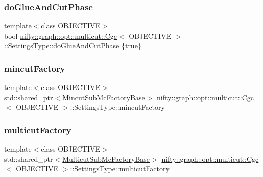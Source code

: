 \subsubsection{\texorpdfstring{do\+Glue\+And\+Cut\+Phase}{doGlueAndCutPhase}}
{\footnotesize\ttfamily template$<$class O\+B\+J\+E\+C\+T\+I\+VE$>$ \\
bool \hyperlink{classnifty_1_1graph_1_1opt_1_1multicut_1_1Cgc}{nifty\+::graph\+::opt\+::multicut\+::\+Cgc}$<$ O\+B\+J\+E\+C\+T\+I\+VE $>$\+::Settings\+Type\+::do\+Glue\+And\+Cut\+Phase \{true\}}

\mbox{\label{structnifty_1_1graph_1_1opt_1_1multicut_1_1Cgc_1_1SettingsType_a57a8c66be7f738117c692d3b694fcaeb}} 
\subsubsection{\texorpdfstring{mincut\+Factory}{mincutFactory}}
{\footnotesize\ttfamily template$<$class O\+B\+J\+E\+C\+T\+I\+VE$>$ \\
std\+::shared\+\_\+ptr$<$\hyperlink{classnifty_1_1graph_1_1opt_1_1multicut_1_1Cgc_ae8877e2556e794a6c14da9cf805d0f5f}{Mincut\+Sub\+Mc\+Factory\+Base}$>$ \hyperlink{classnifty_1_1graph_1_1opt_1_1multicut_1_1Cgc}{nifty\+::graph\+::opt\+::multicut\+::\+Cgc}$<$ O\+B\+J\+E\+C\+T\+I\+VE $>$\+::Settings\+Type\+::mincut\+Factory}

\mbox{\label{structnifty_1_1graph_1_1opt_1_1multicut_1_1Cgc_1_1SettingsType_ad35ea451937b57aa7269f4949751e02d}} 
\subsubsection{\texorpdfstring{multicut\+Factory}{multicutFactory}}
{\footnotesize\ttfamily template$<$class O\+B\+J\+E\+C\+T\+I\+VE$>$ \\
std\+::shared\+\_\+ptr$<$\hyperlink{classnifty_1_1graph_1_1opt_1_1multicut_1_1Cgc_ac0d77f789b221087aac1d2bb4f1cd2da}{Multicut\+Sub\+Mc\+Factory\+Base}$>$ \hyperlink{classnifty_1_1graph_1_1opt_1_1multicut_1_1Cgc}{nifty\+::graph\+::opt\+::multicut\+::\+Cgc}$<$ O\+B\+J\+E\+C\+T\+I\+VE $>$\+::Settings\+Type\+::multicut\+Factory}

